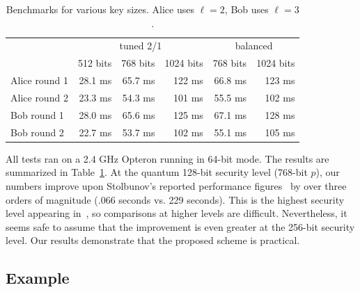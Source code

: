\documentclass[jmc]{degruyter-journal-a}
\theoremstyle{definition}
\begin{document}
\begin{table}[t]
  \centering
  \caption{Benchmarks for various key sizes. Alice uses $\ell=2$, Bob uses $\ell=3$.}
  \label{tab:benchs}
  \begin{tabular}{l | r r r | r r }
    \hline
    & \multicolumn{3}{c|}{tuned 2/1} & \multicolumn{2}{c}{balanced} \\
    & 512 bits & 768 bits & 1024 bits & 768 bits & 1024 bits \\
    \hline
    Alice round 1 & 28.1 ms & 65.7 ms & 122 ms & 66.8 ms & 123 ms \\
    Alice round 2 & 23.3 ms & 54.3 ms & 101 ms & 55.5 ms & 102 ms \\
    Bob round 1   & 28.0 ms & 65.6 ms & 125 ms & 67.1 ms & 128 ms \\
    Bob round 2   & 22.7 ms & 53.7 ms & 102 ms & 55.1 ms & 105 ms \\
    \hline
  \end{tabular}
\end{table}

All tests ran on a 2.4 GHz Opteron running in 64-bit mode. The results
are summarized in Table~\ref{tab:benchs}.  At the quantum 128-bit
security level (768-bit $p$), our numbers improve upon Stolbunov's
reported performance figures~\cite[Table 1]{Stol} by over three orders
of magnitude (.066 seconds vs. 229 seconds).  This is the highest
security level appearing in~\cite[Table 1]{Stol}, so comparisons at
higher levels are difficult. Nevertheless, it seems safe to assume
that the improvement is even greater at the 256-bit security
level. Our results demonstrate that the proposed scheme is practical.

\subsection{Example}\label{sec:ex}
\end{document}
